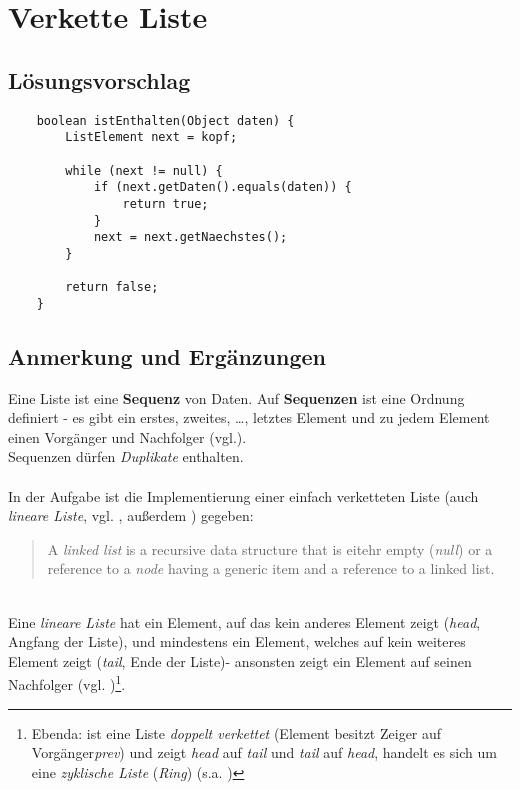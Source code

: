 \chapter{Verkette Liste}



\section{Lösungsvorschlag}

\begin{verbatim}
    boolean istEnthalten(Object daten) {
        ListElement next = kopf;

        while (next != null) {
            if (next.getDaten().equals(daten)) {
                return true;
            }
            next = next.getNaechstes();
        }

        return false;
    }
\end{verbatim}

\section{Anmerkung und Ergänzungen}

Eine Liste ist eine \textbf{Sequenz} von Daten.
Auf \textbf{Sequenzen} ist eine Ordnung definiert - es gibt ein erstes, zweites, \ldots, letztes Element und zu jedem Element einen Vorgänger und Nachfolger (vgl.\cite[63]{GD18c}).\\
Sequenzen dürfen \textit{Duplikate} enthalten.\\

\\
In der Aufgabe ist die Implementierung einer einfach verketteten Liste (auch \textit{lineare Liste}, vgl. \cite[238]{Knu97a}, außerdem \cite[73]{GD18c}) gegeben:\\

\blockquote[{\cite[142]{SW11}}]{
A \textit{linked list} is a recursive data structure that is eitehr empty (\textit{null}) or a reference to a \textit{node} having a generic item and a reference to a linked list.
}\\

\noindent
Eine \textit{lineare Liste} hat ein Element, auf das kein anderes Element zeigt (\textit{head}, Angfang der Liste), und mindestens ein Element, welches auf kein weiteres Element zeigt (\textit{tail}, Ende der Liste)- ansonsten zeigt ein Element auf seinen Nachfolger (vgl. \cite[259]{CL22})\footnote{
Ebenda: ist eine Liste \textit{doppelt verkettet} (Element besitzt Zeiger auf Vorgänger\textit{prev}) und zeigt \textit{head} auf \textit{tail} und \textit{tail} auf \textit{head}, handelt es sich um eine \textit{zyklische Liste} (\textit{Ring}) (s.a. \cite[105]{GD18c})
}.

